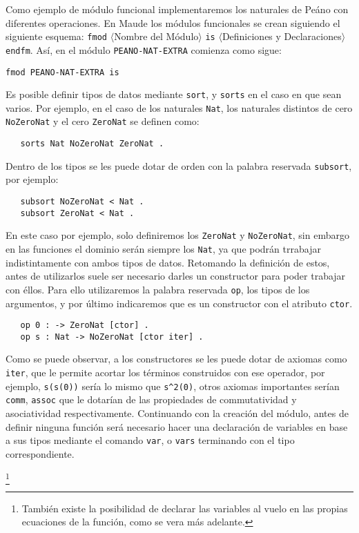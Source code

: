 Como ejemplo de módulo funcional implementaremos los naturales de Peáno con diferentes operaciones. En Maude los módulos funcionales se crean siguiendo el siguiente esquema: \texttt{fmod} $\langle$Nombre del Módulo$\rangle$ \texttt{is} $\langle$Definiciones y Declaraciones$\rangle$ \texttt{endfm}. Así, en el módulo \texttt{PEANO-NAT-EXTRA} comienza como sigue: \par

{\codesize
\begin{verbatim}
fmod PEANO-NAT-EXTRA is
\end{verbatim}
}

Es posible definir tipos de datos mediante \texttt{sort}, y \texttt{sorts} en el caso en que sean varios. Por ejemplo, en el caso de los naturales \texttt{Nat}, los naturales distintos de cero \texttt{NoZeroNat} y el cero \texttt{ZeroNat} se definen como:\par

{\codesize
\begin{verbatim}
   sorts Nat NoZeroNat ZeroNat .
\end{verbatim}
}

Dentro de los tipos se les puede dotar de orden con la palabra reservada \texttt{subsort}, por ejemplo: \par

{\codesize
\begin{verbatim}
   subsort NoZeroNat < Nat .
   subsort ZeroNat < Nat .
\end{verbatim}
}

En este caso por ejemplo, solo definiremos los \texttt{ZeroNat} y \texttt{NoZeroNat}, sin embargo en las funciones el dominio serán siempre los \texttt{Nat}, ya que podrán trrabajar indistintamente con ambos tipos de datos. Retomando la definición de estos, antes de utilizarlos suele ser necesario darles un constructor para poder trabajar con éllos. Para ello utilizaremos la palabra reservada \texttt{op}, los tipos de los argumentos, y por último indicaremos que es un constructor con el atributo \texttt{ctor}. \par

{\codesize
\begin{verbatim}
   op 0 : -> ZeroNat [ctor] .
   op s : Nat -> NoZeroNat [ctor iter] .
\end{verbatim}
}

Como se puede observar, a los constructores se les puede dotar de axiomas como \texttt{iter}, que le permite acortar los términos construidos con ese operador, por ejemplo, \verb"s(s(0))" sería lo mismo que \verb"s^2(0)", otros axiomas importantes serían \texttt{comm}, \texttt{assoc} que le dotarían de las propiedades de commutatividad y asociatividad respectivamente. Continuando con la creación del módulo, antes de definir ninguna función será necesario hacer una declaración de variables en base a sus tipos mediante el comando \texttt{var}, o \texttt{vars} terminando con el tipo correspondiente.\par \footnote{También existe la posibilidad de declarar las variables al vuelo en las propias ecuaciones de la función, como se vera más adelante.} 

